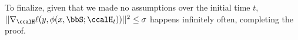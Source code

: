 To finalize, given that we made no assumptions over the initial time $t$, $||\nabla_\ccalH \ell (y,\phi(x,\bbS;\ccalH_t))||^2\leq \sigma$ happens infinitely often, completing the proof. 







